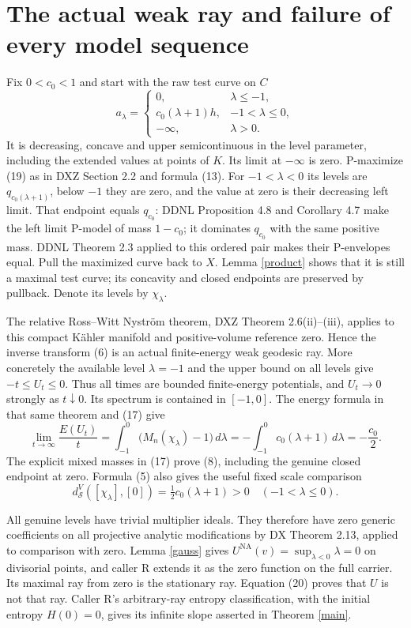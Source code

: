 \documentclass[11pt]{article}
\newcommand{\NA}{\mathrm{NA}}
\newcommand{\ds}{d_{\mathcal S}}
\begin{document}
\section{The actual weak ray and failure of every model sequence}
Fix $0<c_0<1$ and start with the raw test curve on $C$
\[
 a_\lambda=\begin{cases}
 0,&\lambda\le-1,\\
 c_0(\lambda+1)h,&-1<\lambda\le0,\\
 -\infty,&\lambda>0.
 \end{cases}                                               \tag{19}
\]
It is decreasing, concave and upper semicontinuous in the level
parameter, including the extended values at points of $K$.
Its limit at $-\infty$ is zero. P-maximize (19) as in DXZ
Section 2.2 and formula (13). For $-1<\lambda<0$ its levels are
$q_{c_0(\lambda+1)}$, below $-1$ they are zero, and the value at
zero is their decreasing left limit. That endpoint equals $q_{c_0}$:
DDNL Proposition 4.8 and Corollary 4.7 make the left limit P-model
of mass $1-c_0$; it dominates $q_{c_0}$ with the same positive
mass. DDNL Theorem 2.3 applied to this ordered pair makes their
P-envelopes equal. Pull the maximized curve back to $X$.
Lemma \ref{product} shows that it is still a maximal test curve;
its concavity and closed endpoints are preserved by pullback.
Denote its levels by $\chi_\lambda$.

The relative Ross--Witt Nystr\"om theorem, DXZ Theorem 2.6(ii)--(iii),
applies to this compact K\"ahler manifold and positive-volume
reference zero. Hence the inverse transform (6) is an actual
finite-energy weak geodesic ray. More concretely the available
level $\lambda=-1$ and the upper bound on all levels give
$-t\le U_t\le0$. Thus all times are bounded finite-energy
potentials, and $U_t\to0$ strongly as $t\downarrow0$.
Its spectrum is contained in $[-1,0]$. The energy formula in that
same theorem and (17) give
\[
 \lim_{t\to\infty}\frac{E(U_t)}t
 =\int_{-1}^0\big(M_n(\chi_\lambda)-1\big)\,d\lambda
 =-\int_{-1}^0c_0(\lambda+1)\,d\lambda=-\frac{c_0}2.        \tag{20}
\]
The explicit mixed masses in (17) prove (8), including the genuine
closed endpoint at zero. Formula (5) also gives the useful fixed
scale comparison
\[
 \ds^V([\chi_\lambda],[0])=\tfrac12c_0(\lambda+1)>0
                    \quad(-1<\lambda\le0).                \tag{21}
\]

All genuine levels have trivial multiplier ideals. They therefore
have zero generic coefficients on all projective analytic
modifications by DX Theorem 2.13, applied to comparison with zero.
Lemma \ref{gauss} gives $U^\NA(v)=\sup_{\lambda<0}\lambda=0$
on divisorial points, and caller R extends it as the zero function
on the full carrier. Its maximal ray from zero is the stationary
ray. Equation (20) proves that $U$ is not that ray. Caller R's
arbitrary-ray entropy classification, with the initial entropy
$H(0)=0$, gives its infinite slope asserted in Theorem \ref{main}.
\end{document}
